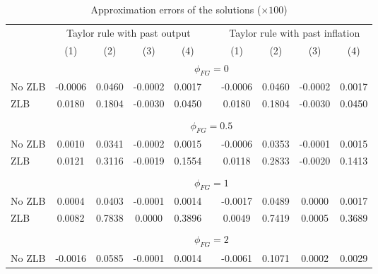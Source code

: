 \begin{table}[H]
  \centering
  \caption{Approximation errors of the solutions ($\times 100$)}
  \begin{threeparttable}
        \begin{tabular}{lccccrlccc}
    \toprule
          & \multicolumn{4}{c}{Taylor rule with past output} &       & \multicolumn{4}{c}{Taylor rule with past inflation} \\
    \cline{2-10}
          & (1)   & (2)   & (3)   & (4)   &       & \multicolumn{1}{c}{(1)} & (2)   & (3)   & (4) \\
    \midrule      
          & \multicolumn{9}{c}{$\phi_{FG}=0$} \\
	\midrule          
    No ZLB & -0.0006 & 0.0460 & -0.0002 & 0.0017 &       & \multicolumn{1}{c}{-0.0006} & 0.0460 & -0.0002 & 0.0017 \\
    ZLB   & 0.0180 & 0.1804 & -0.0030 & 0.0450 &       & \multicolumn{1}{c}{0.0180} & 0.1804 & -0.0030 & 0.0450 \\
          &       &       &       &       &       &       &       &       &  \\
	\midrule          
          & \multicolumn{9}{c}{$\phi_{FG}=0.5$} \\
	\midrule          
    No ZLB & 0.0010 & 0.0341 & -0.0002 & 0.0015 &       & \multicolumn{1}{c}{-0.0006} & 0.0353 & -0.0001 & 0.0015 \\
    ZLB   & 0.0121 & 0.3116 & -0.0019 & 0.1554 &       & \multicolumn{1}{c}{0.0118} & 0.2833 & -0.0020 & 0.1413 \\
          &       &       &       &       &       &       &       &       &  \\
	\midrule          
          & \multicolumn{9}{c}{$\phi_{FG}=1$} \\
	\midrule          
    No ZLB & 0.0004 & 0.0403 & -0.0001 & 0.0014 &       & \multicolumn{1}{c}{-0.0017} & 0.0489 & 0.0000 & 0.0017 \\
    ZLB   & 0.0082 & 0.7838 & 0.0000 & 0.3896 &       & \multicolumn{1}{c}{0.0049} & 0.7419 & 0.0005 & 0.3689 \\
          &       &       &       &       &       &       &       &       &  \\
	\midrule          
          & \multicolumn{9}{c}{$\phi_{FG}=2$} \\
    \midrule      
    No ZLB & -0.0016 & 0.0585 & -0.0001 & 0.0014 &       & \multicolumn{1}{c}{-0.0061} & 0.1071 & 0.0002 & 0.0029 \\

\end{tabular}
\end{threeparttable}
\end{table}
